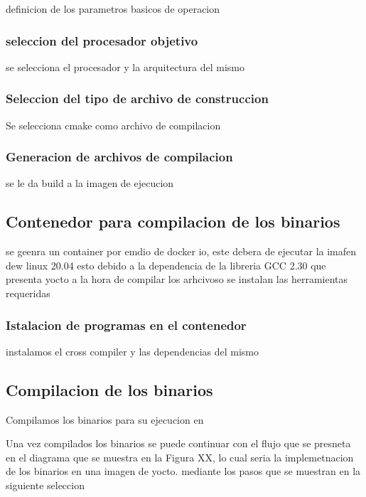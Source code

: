 definicion de los parametros basicos de operacion

\subsubsection{seleccion del procesador objetivo}

se selecciona el procesador y la arquitectura del mismo

\subsubsection{Seleccion del tipo de archivo de construccion}

Se selecciona cmake como archivo de compilacion 

\subsubsection{Generacion de archivos de compilacion}

se le da build a la imagen de ejecucion

\subsection{Contenedor para compilacion de los binarios}

se geenra un container por emdio de docker io, este debera de ejecutar la imafen dew linux 20.04 esto debido a la dependencia de la libreria GCC 2.30 que presenta yocto a la hora de compilar los arhcivoso
se instalan las herramientas requeridas

\subsubsection{Istalacion de programas en el contenedor}

instalamos el cross compiler y las dependencias del mismo

\subsection{Compilacion de los binarios}

Compilamos los binarios para su ejecucion en

Una vez compilados los binarios se puede continuar con el flujo que se presneta en el diagrama que se muestra en la Figura XX, lo cual seria la implemetnacion de los binarios en una imagen de yocto. mediante los pasos que se muestran en la siguiente seleccion


